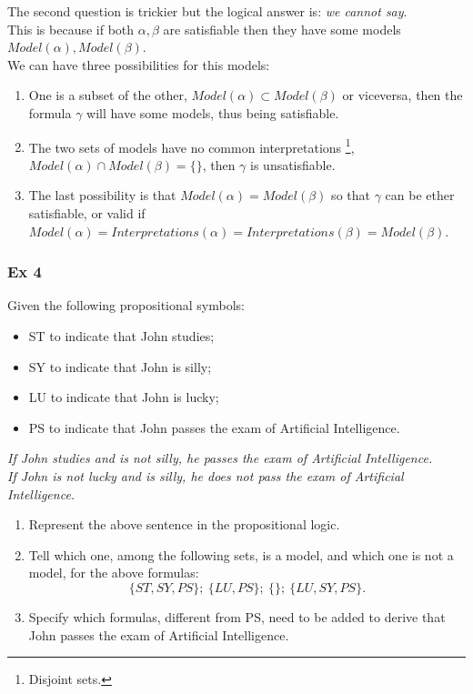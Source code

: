 \documentclass[10pt,a4paper]{article}
\begin{document}
\begin{itemize}
The second question is trickier but the logical answer is: \textit{we cannot say}.\\
This is because if both $\alpha,\beta$ are satisfiable then they have some models $Model(\alpha),Model(\beta)$.\\ 
We can have three possibilities for this models:
\begin{enumerate}
\item One is a subset of the other, $Model(\alpha)\subset Model(\beta)$ or viceversa, then the formula  $\gamma$ will have some models, thus being satisfiable.
\item The two sets of models have no common interpretations \footnote{Disjoint sets.}, $Model(\alpha)\cap Model(\beta)=\{\}$, then $\gamma$ is unsatisfiable.
\item The last possibility is that  $Model(\alpha)= Model(\beta)$ so that $\gamma$ can be ether satisfiable, or valid if $Model(\alpha)=Interpretations(\alpha)=Interpretations(\beta)=Model(\beta)$.
\end{enumerate}

\subsubsection{Ex 4}
Given the following propositional symbols:
\begin{itemize}
\item ST to indicate that John studies;
\item SY to indicate that John is silly;
\item LU to indicate that John is lucky;
\item PS to indicate that John passes the exam of Artificial Intelligence.
\end{itemize}
\begin{center}
\textit{If John studies and is not silly, he passes the exam of Artificial Intelligence.\\
If John is not lucky and is silly, he does not pass the exam of Artificial Intelligence.}
\end{center}

\begin{enumerate}
\item Represent the above sentence in the propositional logic.
\item Tell which one, among the following sets, is a model, and which one is not a model, for the above formulas:
\[\lbrace ST,SY,PS\rbrace;\ \lbrace LU,PS\rbrace;\ \lbrace \rbrace;\ \lbrace LU,SY,PS\rbrace.\]
\item Specify which formulas, different from PS, need to be added to derive that John passes the exam of Artificial Intelligence.
\end{enumerate}


\end{itemize}
\end{document}
